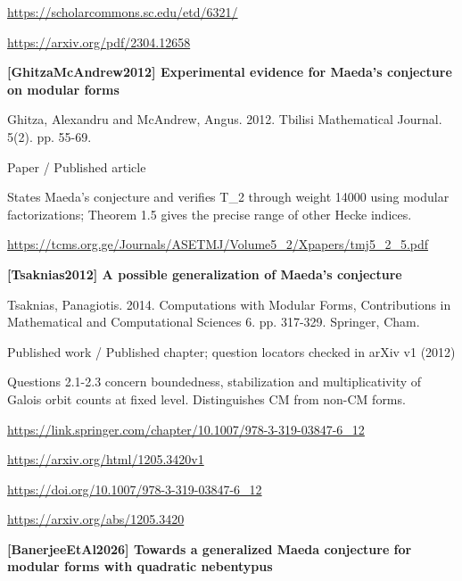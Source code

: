 \documentclass[11pt,a4paper,oneside,openany]{book}
\begin{document}
{\footnotesize\url{https://scholarcommons.sc.edu/etd/6321/}}\par
{\footnotesize\url{https://arxiv.org/pdf/2304.12658}}\par
\vspace{9pt}
\hypertarget{ref:GhitzaMcAndrew2012}{}
{\sffamily\bfseries\color{atlasgreen}[GhitzaMcAndrew2012] Experimental evidence for Maeda's conjecture on modular forms}\par
\color{black} Ghitza, Alexandru and McAndrew, Angus. 2012. Tbilisi Mathematical Journal. 5(2). pp. 55-69.\par
{\small\sffamily\color{atlasgold}Paper / Published article}\par
\color{black} States Maeda's conjecture and verifies T\_\allowbreak{}2 through weight 14000 using modular factorizations; Theorem 1.5 gives the precise range of other Hecke indices.\par
{\footnotesize\url{https://tcms.org.ge/Journals/ASETMJ/Volume5_2/Xpapers/tmj5_2_5.pdf}}\par
\vspace{9pt}
\hypertarget{ref:Tsaknias2012}{}
{\sffamily\bfseries\color{atlasgreen}[Tsaknias2012] A possible generalization of Maeda's conjecture}\par
\color{black} Tsaknias, Panagiotis. 2014. Computations with Modular Forms, Contributions in Mathematical and Computational Sciences 6. pp. 317-329. Springer, Cham.\par
{\small\sffamily\color{atlasgold}Published work / Published chapter; question locators checked in arXiv v1 (2012)}\par
\color{black} Questions 2.1-2.3 concern boundedness, stabilization and multiplicativity of Galois orbit counts at fixed level. Distinguishes CM from non-CM forms.\par
{\footnotesize\url{https://link.springer.com/chapter/10.1007/978-3-319-03847-6_12}}\par
{\footnotesize\url{https://arxiv.org/html/1205.3420v1}}\par
{\footnotesize\url{https://doi.org/10.1007/978-3-319-03847-6_12}}\par
{\footnotesize\url{https://arxiv.org/abs/1205.3420}}\par
\vspace{9pt}
\hypertarget{ref:BanerjeeEtAl2026}{}
{\sffamily\bfseries\color{atlasgreen}[BanerjeeEtAl2026] Towards a generalized Maeda conjecture for modular forms with quadratic nebentypus}\par
\end{document}
